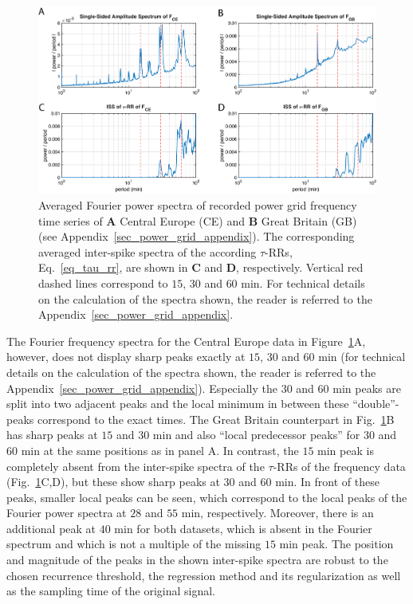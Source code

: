 \documentclass[entropy,article,submit,pdftex,moreauthors]{Definitions/mdpi}
\begin{document}
\begin{figure}
 \centering
 \includegraphics[width=\textwidth]{./figures/fig_power_grid_spectra}
 \caption{Averaged Fourier power spectra of recorded power grid frequency time series of \textbf{A} Central Europe (CE) and \textbf{B} Great Britain (GB) (see Appendix~\ref{sec_power_grid_appendix}). 
 The corresponding averaged inter-spike spectra of the according $\tau$-RRs, Eq.~\eqref{eq_tau_rr}, are shown in \textbf{C} and \textbf{D}, respectively. Vertical red dashed lines correspond to 
 $15$, $30$ and $60$ \si{min}. For technical details on the calculation of the spectra shown, the reader is referred to the Appendix~\ref{sec_power_grid_appendix}.}  
\label{fig_power_grid_spectra}
\end{figure}

The Fourier frequency spectra for the Central Europe data in Figure~\ref{fig_power_grid_spectra}A, however, does not display sharp peaks exactly at $15$, $30$ and $60$ \si{min} 
(for technical details on the calculation of 
the spectra shown, the reader is referred to the Appendix~\ref{sec_power_grid_appendix}). Especially the $30$ and $60$ \si{min} 
peaks are split into two adjacent peaks and the local minimum in between these ``double''-peaks correspond to the exact times. The Great Britain counterpart in Fig.~\ref{fig_power_grid_spectra}B 
has sharp peaks at $15$ and $30$ \si{min} and also ``local predecessor peaks'' for $30$ and $60$ \si{min} at the same positions as in panel A. 
In contrast, the $15$ \si{min} peak is completely absent from the inter-spike spectra of the $\tau$-RRs of the frequency data (Fig.~\ref{fig_power_grid_spectra}C,D), but these show sharp peaks 
at $30$ and $60$ \si{min}. In front of these peaks, smaller local peaks can be seen, which correspond to the local peaks of the Fourier power spectra at $28$ and $55$ \si{min}, respectively.
Moreover, there is an additional peak at 
$40$ \si{min} for both datasets, which is absent in the Fourier spectrum and which is not a multiple of the missing $15$ \si{min} peak. The position and magnitude of the peaks in the shown 
inter-spike spectra are robust to the chosen recurrence threshold, the regression method and its regularization as well as the sampling time of the original signal.\\ 
\end{document}
